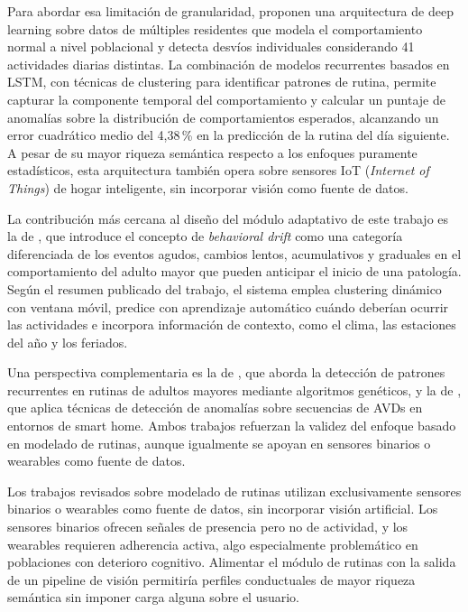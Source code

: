 Para abordar esa limitación de granularidad, \textcite{Cejudo2025} proponen una arquitectura de deep learning sobre datos de múltiples residentes que modela el comportamiento normal a nivel poblacional y detecta desvíos individuales considerando 41 actividades diarias distintas.
La combinación de modelos recurrentes basados en LSTM, con técnicas de clustering para identificar patrones de rutina, permite capturar la componente temporal del comportamiento y calcular un puntaje de anomalías sobre la distribución de comportamientos esperados, alcanzando un error cuadrático medio del 4,38\,\% en la predicción de la rutina del día siguiente.
A pesar de su mayor riqueza semántica respecto a los enfoques puramente estadísticos, esta arquitectura también opera sobre sensores IoT (\textit{Internet of Things}) de hogar inteligente, sin incorporar visión como fuente de datos.

La contribución más cercana al diseño del módulo adaptativo de este trabajo es la de \textcite{Snoun2024}, que introduce el concepto de \textit{behavioral drift} como una categoría diferenciada de los eventos agudos, cambios lentos, acumulativos y graduales en el comportamiento del adulto mayor que pueden anticipar el inicio de una patología.
Según el resumen publicado del trabajo, el sistema emplea clustering dinámico con ventana móvil, predice con aprendizaje automático cuándo deberían ocurrir las actividades e incorpora información de contexto, como el clima, las estaciones del año y los feriados.

Una perspectiva complementaria es la de \textcite{Chifu2022}, que aborda la detección de patrones recurrentes en rutinas de adultos mayores mediante algoritmos genéticos, y la de \textcite{Yahaya2021}, que aplica técnicas de detección de anomalías sobre secuencias de AVDs en entornos de smart home.
Ambos trabajos refuerzan la validez del enfoque basado en modelado de rutinas, aunque igualmente se apoyan en sensores binarios o wearables como fuente de datos.

Los trabajos revisados sobre modelado de rutinas utilizan exclusivamente sensores binarios o wearables como fuente de datos, sin incorporar visión artificial.
Los sensores binarios ofrecen señales de presencia pero no de actividad, y los wearables requieren adherencia activa, algo especialmente problemático en poblaciones con deterioro cognitivo.
Alimentar el módulo de rutinas con la salida de un pipeline de visión permitiría perfiles conductuales de mayor riqueza semántica sin imponer carga alguna sobre el usuario.

